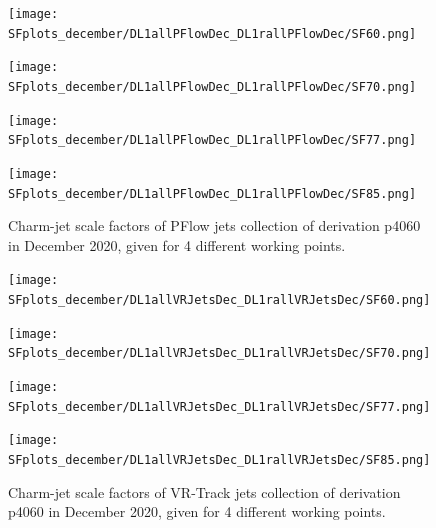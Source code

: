 \documentclass[letterpaper,12pt]{article}
\begin{document}
\begin{figure}[H]
\begin{minipage}[b]{.45\textwidth}
\centering
\texttt{[image: SFplots\_december/DL1allPFlowDec\_DL1rallPFlowDec/SF60.png]}
\end{minipage}\hfill
\begin{minipage}[b]{.45\textwidth}
\centering
\texttt{[image: SFplots\_december/DL1allPFlowDec\_DL1rallPFlowDec/SF70.png]}
\end{minipage}\hfill
\begin{minipage}[b]{.45\textwidth}
\centering
\texttt{[image: SFplots\_december/DL1allPFlowDec\_DL1rallPFlowDec/SF77.png]}
\end{minipage}\hfill
\begin{minipage}[b]{.45\textwidth}
\centering
\texttt{[image: SFplots\_december/DL1allPFlowDec\_DL1rallPFlowDec/SF85.png]}
\end{minipage}
\caption{Charm-jet scale factors of PFlow jets collection of derivation 
p4060 in December 2020, given for 4 different working points.} \label{fig:Dec_SF_PFlow}
\end{figure}

\begin{figure}[H]
\begin{minipage}[b]{.45\textwidth}
\centering
\texttt{[image: SFplots\_december/DL1allVRJetsDec\_DL1rallVRJetsDec/SF60.png]}
\end{minipage}\hfill
\begin{minipage}[b]{.45\textwidth}
\centering
\texttt{[image: SFplots\_december/DL1allVRJetsDec\_DL1rallVRJetsDec/SF70.png]}
\end{minipage}\hfill
\begin{minipage}[b]{.45\textwidth}
\centering
\texttt{[image: SFplots\_december/DL1allVRJetsDec\_DL1rallVRJetsDec/SF77.png]}
\end{minipage}\hfill
\begin{minipage}[b]{.45\textwidth}
\centering
\texttt{[image: SFplots\_december/DL1allVRJetsDec\_DL1rallVRJetsDec/SF85.png]}
\end{minipage}
\caption{Charm-jet scale factors of VR-Track jets collection of derivation 
p4060 in December 2020, given for 4 different working points.} \label{fig:Dec_SF_VRJets}
\end{figure}


\end{document}
